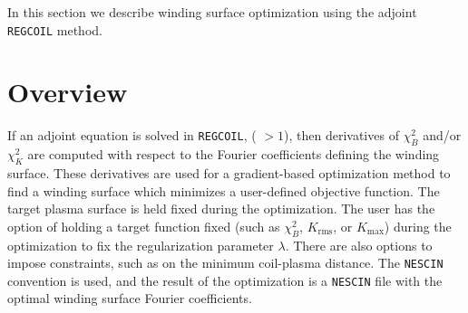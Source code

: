 In this section we describe winding surface optimization using the adjoint \texttt{REGCOIL} method. 

\section{Overview}

If an adjoint equation is solved in \texttt{REGCOIL}, ( $> 1$), then derivatives of $\chi^2_B$ and/or $\chi^2_K$ are computed with respect to the Fourier coefficients defining the winding surface. 
These derivatives are used for a gradient-based optimization method to find a winding surface which minimizes a user-defined objective function. The target plasma surface is held fixed during the optimization. The user has the option of holding a target function fixed (such as $\chi^2_B$, $K_{\text{rms}}$, or $K_{\max}$) during the optimization to fix the regularization parameter $\lambda$. There are also options to impose constraints, such as on the minimum coil-plasma distance. 
The \texttt{NESCIN} convention is used, and the result of the optimization is a \texttt{NESCIN} file with the optimal winding surface Fourier coefficients. 

